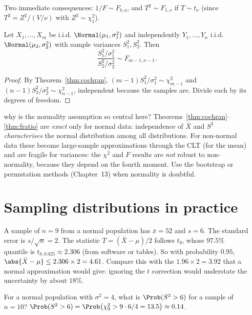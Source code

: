 Two immediate consequences: $1/F\sim F_{b,a}$, and $T^2\sim F_{1,\nu}$ if $T\sim t_\nu$ (since $T^2=Z^2/(V/\nu)$ with $Z^2\sim\chi^2_1$).

\begin{theorem}\label{thm:fratio}
Let $X_1,\dots,X_m$ be i.i.d. $\Normal(\mu_1,\sigma_1^2)$ and independently $Y_1,\dots,Y_n$ i.i.d. $\Normal(\mu_2,\sigma_2^2)$ with sample variances $S_1^2,S_2^2$. Then
\[ \frac{S_1^2/\sigma_1^2}{S_2^2/\sigma_2^2}\sim F_{m-1,n-1}. \]
\end{theorem}

\begin{proof}
By Theorem~\ref{thm:cochran}, $(m-1)S_1^2/\sigma_1^2\sim\chi^2_{m-1}$ and $(n-1)S_2^2/\sigma_2^2\sim\chi^2_{n-1}$, independent because the samples are. Divide each by its degrees of freedom.
\end{proof}

\begin{interview}{why is the normality assumption so central here?}
Theorems~\ref{thm:cochran}--\ref{thm:fratio} are \emph{exact} only for normal data: independence of $\bar{X}$ and $S^2$ \emph{characterises} the normal distribution among all distributions. For non-normal data these become large-sample approximations through the CLT (for the mean) and are fragile for variances: the $\chi^2$ and $F$ results are \emph{not} robust to non-normality, because they depend on the fourth moment. Use the bootstrap or permutation methods (Chapter~13) when normality is doubtful.
\end{interview}

\section{Sampling distributions in practice}

\begin{example}
A sample of $n=9$ from a normal population has $\bar{x}=52$ and $s=6$. The standard error is $s/\sqrt n=2$. The statistic $T=(\bar{X}-\mu)/2$ follows $t_8$, whose $97.5\%$ quantile is $t_{8,0.025}\approx2.306$ (from software or tables). So with probability $0.95$, $\abs{\bar{X}-\mu}\le2.306\times2=4.61$. Compare this with the $1.96\times2=3.92$ that a normal approximation would give: ignoring the $t$ correction would understate the uncertainty by about $18\%$.
\end{example}

\begin{example}
For a normal population with $\sigma^2=4$, what is $\Prob(S^2>6)$ for a sample of $n=10$? $\Prob(S^2>6)=\Prob\big(\chi^2_9>9\cdot6/4=13.5\big)\approx0.14$.
\end{example}

